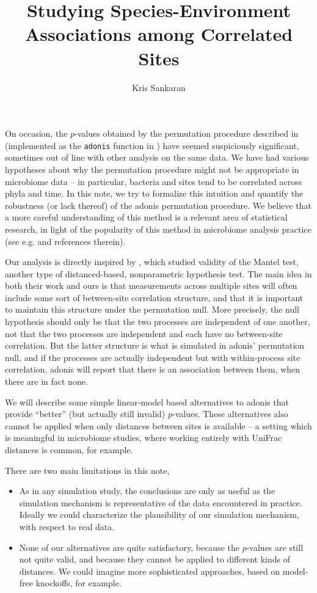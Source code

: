 \documentclass{article}
\title{Studying Species-Environment Associations among Correlated Sites}
\author{Kris Sankaran}
\begin{document}
\maketitle

On occasion, the $p$-values obtained by the permutation procedure described in
\citep{anderson2001new} (implemented as the \texttt{adonis} function in
\cite{oksanen2007vegan}) have seemed suspiciously significant, sometimes out of
line with other analysis on the same data. We have had various hypotheses about
why the permutation procedure might not be appropriate in microbiome data -- in
particular, bacteria and sites tend to be correlated across phyla and time. In
this note, we try to formalize this intuition and quantify the robustness (or
lack thereof) of the adonis permutation procedure. We believe that a more
careful understanding of this method is a relevant area of statistical research,
in light of the popularity of this method in microbiome analysis practice (see
e.g. \cite{fukuyama2012comparisons} and references therein).

Our analysis is directly inspired by \citep{guillot2013dismantling}, which
studied validity of the Mantel test, another type of distanced-based,
nonparametric hypothesis test. The main idea in both their work and ours is that
measurements across multiple sites will often include some sort of between-site
correlation structure, and that it is important to maintain this structure under
the permutation null. More precisely, the null hypothesis should only be that
the two processes are independent of one another, not that the two processes are
independent and each have no between-site correlation. But the latter structure
is what is simulated in adonis' permutation null, and if the processes are
actually independent but with within-process site correlation, adonis will
report that there is an association between them, when there are in fact none.

We will describe some simple linear-model based alternatives to adonis that
provide ``better'' (but actually still invalid) $p$-values. These alternatives
also cannot be applied when only distances between sites is available -- a
setting which is meaningful in microbiome studies, where working entirely with
UniFrac distances \citep{lozupone2005unifrac} is common, for example.

There are two main limitations in this note,
\begin{itemize}
\item As in any simulation study, the conclusions are only as useful as the
  simulation mechanism is representative of the data encountered in practice.
  Ideally we could characterize the plausibility of our simulation mechanism,
  with respect to real data.
\item None of our alternatives are quite satisfactory, because the $p$-values
  are still not quite valid, and because they cannot be applied to different
  kinds of distances. We could imagine more sophisticated approaches, based on
  model-free knockoffs, for example.
\end{itemize}
\end{document}
